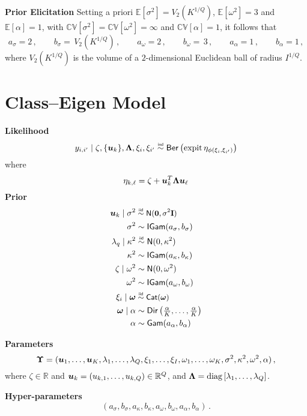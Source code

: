 \documentclass[letterpaper,12pt,openany]{article}
\DeclareMathOperator*{\expit}{expit}
\newcommand\simiid{\mathrel{\overset{\makebox[0pt]{\mbox{\normalfont\tiny\sffamily iid}}}{\sim}}}
\newcommand\simind{\mathrel{\overset{\makebox[0pt]{\mbox{\normalfont\tiny\sffamily ind}}}{\sim}}}
\newcommand{\expec}[1]{\mathbb{E}\left[#1\right]}
\newcommand{\CV}[1]{\mathbb{C}\mathbb{V}\left[#1\right]}
\newcommand{\diag}[1]{\text{diag}\left[#1\right]}
\def\Cat{\small{\mathsf{Cat}}}
\def\Dir{\small{\mathsf{Dir}}}
\def\Ber{\small{\mathsf{Ber}}}
\def\Nor{\small{\mathsf{N}}}
\def\Gamd{\small{\mathsf{Gam}}}
\def\IGamd{\small{\mathsf{IGam}}}
\def\I{\mathbf{I}}\def\i{\mathbf{i}}\def\Iv{\boldsymbol{I}}\def\iv{\boldsymbol{i}}
\def\al{\alpha}\def\alv{\boldsymbol{\alpha}}
\def\lam{\lambda}\def\lamv{\boldsymbol{\lambda}}
\def\sig{\sigma}\def\sigv{\boldsymbol{\sigma}}
\def\ome{\omega}
\def\kap{\kappa}
\def\zerov{\boldsymbol{0}}
\def\reals{\mathbb{R}}
\begin{document}
\textbf{Prior Elicitation}
Setting a priori $\expec{\sigma^2} = V_2\left(K^{1/Q}\right)$, $\expec{\omega^2} = 3$ and $\expec{\al} = 1$, with $\CV{\sigma^2} = \CV{\omega^2} = \infty$ and $\CV{\al} = 1$, it follows that
$$
a_\sig = 2\,,\qquad b_\sig = \, V_2\left(K^{1/Q}\right)  \,,\qquad a_\ome =2\,,\qquad b_\ome = \,3\,,\qquad a_\al = 1\,,\qquad b_\al = 1\,,
$$
where $V_2(K^{1/Q})$ is the volume of a $2$-dimensional Euclidean ball of radius $I^{1/Q}$.

\section{Class--Eigen Model}

\textbf{Likelihood}
$$y_{i,i'}\mid \zeta, \{\uv_k\},\LAM, \xi_i,\xi_{i'} \simind \Ber\left( \expit\eta_{\phi(\xi_i,\xi_{i'})}  \right)$$
where
$$\eta_{k,\ell} = \zeta + \boldsymbol{u}_k^T\mathbf{\Lambda}\boldsymbol{u}_\ell$$
\textbf{Prior}
\begin{align*}
\uv_{k}\mid\sigma^2 & \simiid \Nor(\zerov,\sig^2\I) \\
\sigma^2            & \sim    \IGamd(a_{\sig}, b_{\sig}) \\
\lambda_q\mid\kap^2 & \simiid \Nor(0,\kap^2)        \\
\kappa^2            & \sim    \IGamd(a_{\kap}, b_{\kap}) \\
\zeta\mid \ome^2    & \sim    \Nor(0,\ome^2)        \\
\ome^2              & \sim    \IGamd(a_{\ome}, b_{\ome}) \\
\xi_i\mid\omev &\simiid \Cat(\omev) \\
\omev\mid\al &\sim \Dir\left(\tfrac{\al}{K},\ldots,\tfrac{\al}{K}\right) \\
\al &\sim \Gamd(a_\al,b_\al)
\end{align*}

\textbf{Parameters}
$$\UPS=(\uv_1,\ldots,\uv_K, \lam_1, \ldots, \lambda_Q, \xi_1,\ldots,\xi_I,\omega_1,\ldots,\omega_K, \sig^2, \kap^2, \ome^2, \alpha)\,,$$
where $\zeta\in\reals$ and $\uv_k=(u_{k,1},\ldots,u_{k,Q})\in\reals^Q$, and $\LAM = \diag{\lambda_1,\ldots,\lambda_Q}$.

\textbf{Hyper-parameters} $$(a_{\sig}, b_{\sig}, a_{\kap}, b_{\kap}, a_{\ome}, b_{\ome}, a_\al, b_\al)\,.$$
\end{document}
